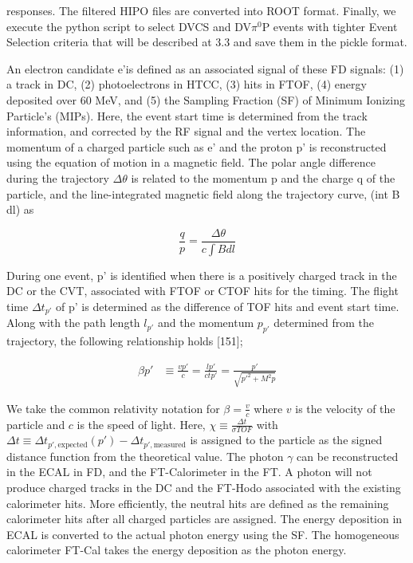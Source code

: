 responses. The filtered HIPO files are converted into ROOT format. Finally, we execute the python script to select DVCS and DV$\pi^0$P events with tighter Event Selection criteria that will be described at 3.3 and save them in the pickle format.

An electron candidate e'is defined as an associated signal of these FD signals: (1) a track in DC, (2) photoelectrons in HTCC, (3) hits in FTOF, (4) energy deposited over 60 MeV, and (5) the Sampling Fraction (SF) of Minimum Ionizing Particle’s (MIPs). Here, the event start time is determined from the track information, and corrected by the RF signal and the vertex location. The momentum of a charged particle such as e' and the proton p' is reconstructed using the equation of motion in a magnetic field. The polar angle difference during the trajectory $\Delta \theta$ is related to the momentum p and the charge q of the particle, and the line-integrated magnetic field along the trajectory curve, (int B dl) as

\begin{equation}
    \frac{q}{p} = \frac{\Delta \theta}{c \int B dl}
\end{equation}

During one event, p' is identified when there is a positively charged track in the DC
or the CVT, associated with FTOF or CTOF hits for the timing. The flight time $\Delta t_{p'}$ of p' is determined as the difference of TOF hits and event start time. Along
with the path length $l_{p'}$ and the momentum $p_{p'}$ determined from the trajectory, the following relationship holds [151];

\begin{align*}
    \beta p' &\equiv \frac{v p'}{c} = \frac{l p'}{c t p'} = \frac{p'}{\sqrt{p'^2 + M^2 p}}
\end{align*}

We take the common relativity notation for $\beta = \frac{v}{c}$ where $v$ is the velocity of the particle and $c$ is the speed of light. Here, $\chi \equiv \frac{\Delta t}{\sigma TOF}$ with $\Delta t \equiv \Delta t_{p', \text{expected}}(p') - \Delta t_{p', \text{measured}}$ is assigned to the particle as the signed distance function from the theoretical value. The photon $\gamma$ can be reconstructed in the ECAL in FD, and the FT-Calorimeter in the FT. A photon will not produce charged tracks in the DC and the FT-Hodo associated with the existing calorimeter hits. More efficiently, the neutral hits are defined as the remaining calorimeter hits after all charged particles are assigned. The energy deposition in ECAL is converted to the actual photon energy using the SF. The homogeneous calorimeter FT-Cal takes the energy deposition as the photon energy.

